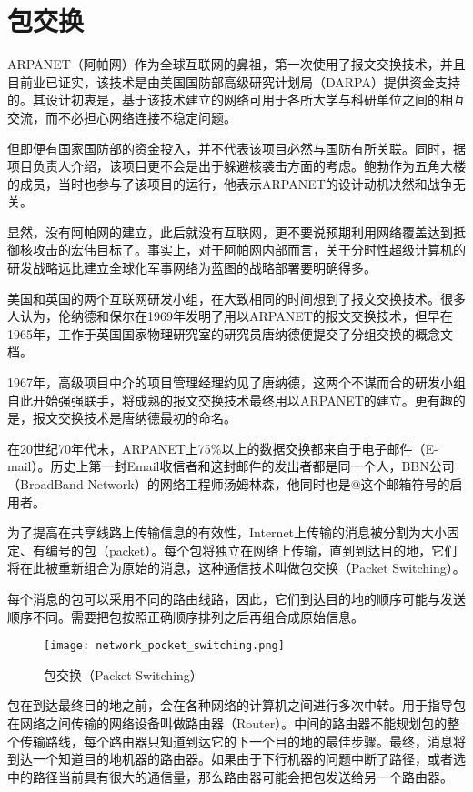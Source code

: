 \section{包交换}


ARPANET（阿帕网）作为全球互联网的鼻祖，第一次使用了报文交换技术，并且目前业已证实，该技术是由美国国防部高级研究计划局（DARPA）提供资金支持的。其设计初衷是，基于该技术建立的网络可用于各所大学与科研单位之间的相互交流，而不必担心网络连接不稳定问题。



但即便有国家国防部的资金投入，并不代表该项目必然与国防有所关联。同时，据项目负责人介绍，该项目更不会是出于躲避核袭击方面的考虑。鲍勃作为五角大楼的成员，当时也参与了该项目的运行，他表示ARPANET的设计动机决然和战争无关。



显然，没有阿帕网的建立，此后就没有互联网，更不要说预期利用网络覆盖达到抵御核攻击的宏伟目标了。事实上，对于阿帕网内部而言，关于分时性超级计算机的研发战略远比建立全球化军事网络为蓝图的战略部署要明确得多。




美国和英国的两个互联网研发小组，在大致相同的时间想到了报文交换技术。很多人认为，伦纳德和保尔在1969年发明了用以ARPANET的报文交换技术，但早在1965年，工作于英国国家物理研究室的研究员唐纳德便提交了分组交换的概念文档。


1967年，高级项目中介的项目管理经理约见了唐纳德，这两个不谋而合的研发小组自此开始强强联手，将成熟的报文交换技术最终用以ARPANET的建立。更有趣的是，报文交换技术是唐纳德最初的命名。

在20世纪70年代末，ARPANET上75\%以上的数据交换都来自于电子邮件（E-mail）。历史上第一封Email收信者和这封邮件的发出者都是同一个人，BBN公司（BroadBand Network）的网络工程师汤姆林森，他同时也是@这个邮箱符号的启用者。

为了提高在共享线路上传输信息的有效性，Internet上传输的消息被分割为大小固定、有编号的包（packet）。每个包将独立在网络上传输，直到到达目的地，它们将在此被重新组合为原始的消息，这种通信技术叫做包交换（Packet Switching）。

每个消息的包可以采用不同的路由线路，因此，它们到达目的地的顺序可能与发送顺序不同。需要把包按照正确顺序排列之后再组合成原始信息。


\begin{figure}[!h]
\centering
\texttt{[image: network\_pocket\_switching.png]}
\caption{包交换（Packet Switching）}
\label{network_pocket_switching}
\end{figure}

包在到达最终目的地之前，会在各种网络的计算机之间进行多次中转。用于指导包在网络之间传输的网络设备叫做路由器（Router）。中间的路由器不能规划包的整个传输路线，每个路由器只知道到达它的下一个目的地的最佳步骤。最终，消息将到达一个知道目的地机器的路由器。如果由于下行机器的问题中断了路径，或者选中的路径当前具有很大的通信量，那么路由器可能会把包发送给另一个路由器。

